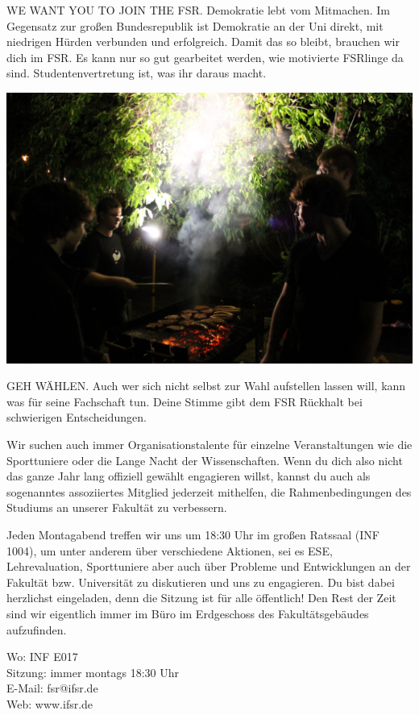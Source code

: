 WE WANT YOU TO JOIN THE FSR.
Demokratie lebt vom Mitmachen.
Im Gegensatz zur großen Bundesrepublik ist Demokratie an der Uni direkt, mit niedrigen Hürden verbunden und erfolgreich.
Damit das so bleibt, brauchen wir dich im FSR.
Es kann nur so gut gearbeitet werden, wie motivierte FSRlinge da sind.
Studentenvertretung ist, was ihr daraus macht.

\includegraphics[width=\linewidth]{img/ese2013/grillen.jpg}

GEH WÄHLEN.
Auch wer sich nicht selbst zur Wahl aufstellen lassen will, kann was für seine Fachschaft tun.
Deine Stimme gibt dem FSR Rückhalt bei schwierigen Entscheidungen.

Wir suchen auch immer Organisationstalente für einzelne Veranstaltungen wie die Sporttuniere oder die Lange Nacht der Wissenschaften.
Wenn du dich also nicht das ganze Jahr lang offiziell gewählt engagieren willst, kannst du auch als sogenanntes assoziiertes Mitglied jederzeit mithelfen, die Rahmenbedingungen des Studiums an unserer Fakultät zu verbessern.

Jeden Montagabend treffen wir uns um 18:30 Uhr im großen Ratssaal (INF 1004), um unter anderem über verschiedene Aktionen, sei es ESE, Lehrevaluation, Sporttuniere aber auch über Probleme und Entwicklungen an der Fakultät bzw. Universität zu diskutieren und uns zu engagieren.
Du bist dabei herzlichst eingeladen, denn die Sitzung ist für alle öffentlich!
Den Rest der Zeit sind wir eigentlich immer im Büro im Erdgeschoss des Fakultätsgebäudes aufzufinden.

Wo: INF E017 \\
Sitzung: immer montags 18:30 Uhr \\
E-Mail: fsr@ifsr.de \\
Web: www.ifsr.de

